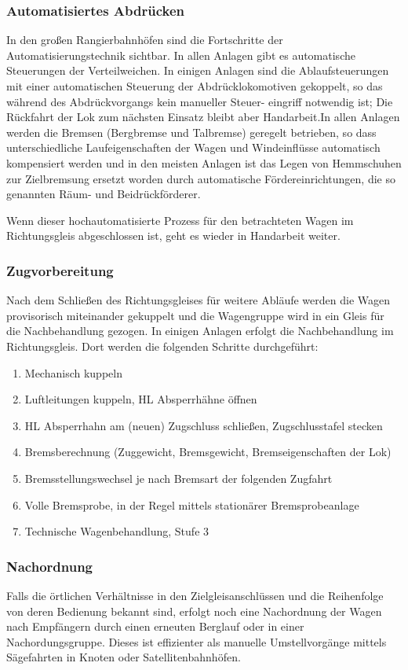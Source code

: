 \subsubsection{Automatisiertes Abdrücken}\label{sec:automAbdruecken}
In den großen Rangierbahnhöfen sind die Fortschritte der Automatisierungstechnik sichtbar. In allen Anlagen gibt es automatische Steuerungen der Verteilweichen. In einigen Anlagen sind die Ablaufsteuerungen mit einer automatischen Steuerung der Abdrücklokomotiven gekoppelt, so das während des Abdrückvorgangs kein manueller Steuer- eingriff notwendig ist; Die Rückfahrt der Lok zum nächsten Einsatz bleibt aber Handarbeit.In allen Anlagen werden die Bremsen (Bergbremse und Talbremse) geregelt betrieben, so dass unterschiedliche Laufeigenschaften der Wagen und Windeinflüsse automatisch kompensiert werden und in den meisten Anlagen ist das Legen von Hemmschuhen zur Zielbremsung ersetzt worden durch automatische Fördereinrichtungen, die so genannten Räum- und Beidrückförderer.\par
Wenn dieser hochautomatisierte Prozess für den betrachteten Wagen im Richtungsgleis abgeschlossen ist, geht es wieder in Handarbeit weiter.
\subsubsection{Zugvorbereitung}\label{sec:Zugvorbereitung}
Nach dem Schließen des Richtungsgleises für weitere Abläufe werden die Wagen provisorisch miteinander gekuppelt und die Wagengruppe wird in ein Gleis für die Nachbehandlung gezogen. In einigen Anlagen erfolgt die Nachbehandlung im Richtungsgleis. Dort werden die folgenden Schritte durchgeführt:
\begin{enumerate}
    \item Mechanisch kuppeln
    \item Luftleitungen kuppeln, \acrshort{HL} Absperrhähne öffnen
    \item \acrshort{HL} Absperrhahn am (neuen) \gls{Zugschluss} schließen, Zugschlusstafel stecken
    \item Bremsberechnung (Zuggewicht, Bremsgewicht, Bremseigenschaften der Lok)
    \item Bremsstellungswechsel je nach Bremsart der folgenden \gls{Zugfahrt}
    \item Volle \gls{Bremsprobe}, in der Regel mittels stationärer \gls{Bremsprobeanlage}
    \item Technische Wagenbehandlung, Stufe 3
\end{enumerate}
\subsubsection{Nachordnung}
Falls die örtlichen Verhältnisse in den Zielgleisanschlüssen und die Reihenfolge von deren Bedienung bekannt sind, erfolgt noch eine Nachordnung der Wagen nach Empfängern durch einen erneuten Berglauf oder in einer Nachordungsgruppe. Dieses ist effizienter als manuelle Umstellvorgänge mittels Sägefahrten in Knoten oder Satellitenbahnhöfen.

